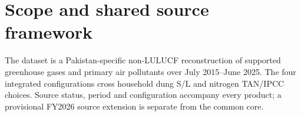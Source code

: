 \section{Scope and shared source framework}\label{sec:scope}
The dataset is a Pakistan-specific non-LULUCF reconstruction of supported greenhouse gases and primary air pollutants over July 2015--June 2025. The four integrated configurations cross household dung S/L and nitrogen TAN/IPCC choices. Source status, period and configuration accompany every product; a provisional FY2026 source extension is separate from the common core.
\pkinvLeadFragment

\pkinvEndFragment
\pkinvDemoteFragment

\pkinvEndFragment

